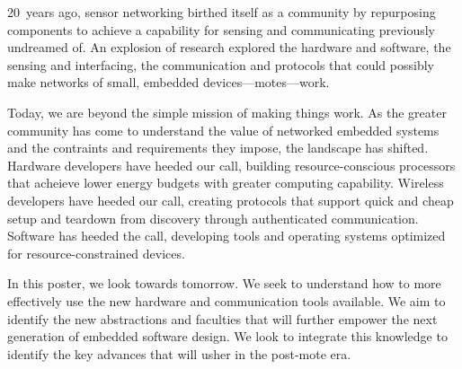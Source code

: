 
20~years ago, sensor networking birthed itself as a community by repurposing
components to achieve a capability for sensing and communicating previously
undreamed of. An explosion of research explored the hardware and software, the
sensing and interfacing, the communication and protocols that could possibly
make networks of small, embedded devices---motes---work.

Today, we are beyond the simple mission of making things work. As the greater
community has come to understand the value of networked embedded systems and
the contraints and requirements they impose, the landscape has shifted.
Hardware developers have heeded our call, building resource-conscious
processors that acheieve lower energy budgets with greater computing
capability. Wireless developers have heeded our call, creating protocols that
support quick and cheap setup and teardown from discovery through
authenticated communication. Software has heeded the call, developing tools
and operating systems optimized for resource-constrained devices.

In this poster, we look towards tomorrow. We seek to understand how to more
effectively use the new hardware and communication tools available. We aim to
identify the new abstractions and faculties that will further empower the next
generation of embedded software design. We look to integrate this knowledge to
identify the key advances that will usher in the post-mote era.

